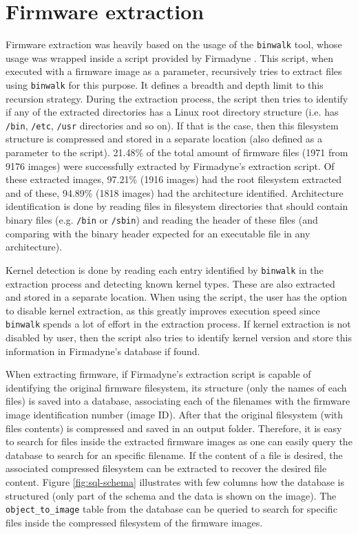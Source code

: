 \section{Firmware extraction}
\label{sec:firmware-extraction}

Firmware extraction was heavily based on the usage of the {\tt binwalk} tool, whose usage was wrapped inside a script provided by Firmadyne \cite{firmadyne}. This script, when executed with a firmware image as a parameter, recursively tries to extract files using {\tt binwalk} for this purpose. It defines a breadth and depth limit to this recursion strategy. During the extraction process, the script then tries to identify if any of the extracted directories has a Linux root directory structure (i.e. has {\tt /bin}, {\tt /etc}, {\tt /usr} directories and so on). If that is the case, then this filesystem structure is compressed and stored in a separate location (also defined as a parameter to the script). 21.48\% of the total amount of firmware files (1971 from 9176 images) were successfully extracted by Firmadyne's \cite{firmadyne} extraction script. Of these extracted images, 97.21\% (1916 images) had the root filesystem extracted and of these, 94.89\% (1818 images) had the architecture identified. Architecture identification is done by reading files in filesystem directories that should contain binary files (e.g. {\tt /bin} or {\tt /sbin}) and reading the header of these files (and comparing with the binary header expected for an executable file in any architecture).

Kernel detection is done by reading each entry identified by {\tt binwalk} in the extraction process and detecting known kernel types. These are also extracted and stored in a separate location. When using the script, the user has the option to disable kernel extraction, as this greatly improves execution speed since {\tt binwalk} spends a lot of effort in the extraction process. If kernel extraction is not disabled by user, then the script also tries to identify kernel version and store this information in Firmadyne's \cite{firmadyne} database if found.

When extracting firmware, if Firmadyne's extraction script is capable of identifying the original firmware filesystem, its structure (only the names of each files) is saved into a database, associating each of the filenames with the firmware image identification number (image ID). After that the original filesystem (with files contents) is compressed and saved in an output folder. Therefore, it is easy to search for files inside the extracted firmware images as one can easily query the database to search for an specific filename. If the content of a file is desired, the associated compressed filesystem can be extracted to recover the desired file content. Figure \ref{fig:sql-schema} illustrates with few columns how the database is structured (only part of the schema and the data is shown on the image). The {\tt object\_to\_image} table from the database can be queried to search for specific files inside the compressed filesystem of the firmware images.

